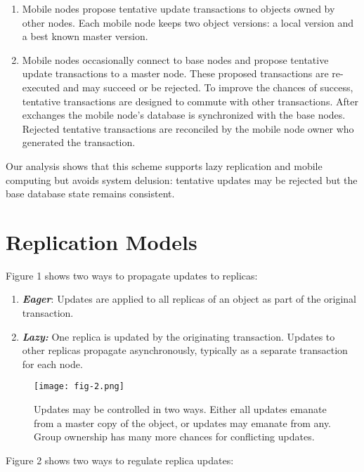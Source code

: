\documentclass[a4paper,12pt,twoside,openright]{article}
\begin{document}
\begin{enumerate}
\def\labelenumi{\arabic{enumi}.}
\item
  Mobile nodes propose tentative update transactions to objects owned by
  other nodes. Each mobile node keeps two object versions: a local
  version and a best known master version.
\item
  Mobile nodes occasionally connect to base nodes and propose tentative
  update transactions to a master node. These proposed transactions are
  re-executed and may succeed or be rejected. To improve the chances of
  success, tentative transactions are designed to commute with other
  transactions. After exchanges the mobile node's database is
  synchronized with the base nodes. Rejected tentative transactions are
  reconciled by the mobile node owner who generated the transaction.
\end{enumerate}

Our analysis shows that this scheme supports lazy replication and mobile
computing but avoids system delusion: tentative updates may be rejected
but the base database state remains consistent.

\section{Replication Models}

Figure 1 shows two ways to propagate updates to replicas:

\begin{enumerate}
\def\labelenumi{\arabic{enumi}.}
\item
  \emph{\textbf{Eager}}: Updates are applied to all replicas of an
  object as part of the original transaction.
\item
  \emph{\textbf{Lazy:}} One replica is updated by the originating
  transaction. Updates to other replicas propagate asynchronously,
  typically as a separate transaction for each node.
\end{enumerate}

\begin{figure}
  \centering
  \texttt{[image: fig-2.png]}
  \caption{Updates may be controlled in two ways. Either all updates
emanate from a master copy of the object, or updates may emanate from
any. Group ownership has many more chances for conflicting updates.}
\end{figure}

Figure 2 shows two ways to regulate replica updates:
\end{document}
